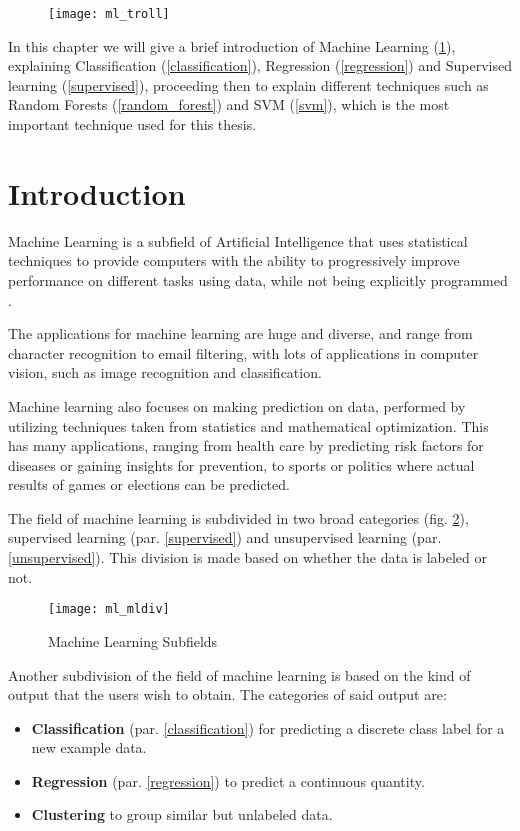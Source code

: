 
\begin{figure}[H]
	\centering
	\texttt{[image: ml\_troll]}
	\label{fig:ml_troll}
\end{figure}

In this chapter we will give a brief introduction of Machine Learning (\ref{ml}), explaining Classification (\ref{classification}), Regression (\ref{regression}) and Supervised learning (\ref{supervised}), proceeding then to explain different techniques such as Random Forests (\ref{random_forest}) and SVM (\ref{svm}), which is the most important technique used for this thesis.

\section{Introduction} \label{ml}

Machine Learning is a subfield of Artificial Intelligence that uses statistical techniques to provide computers with the ability to progressively improve performance on different tasks using data, while not being explicitly programmed \cite{wiki:ml}.

The applications for machine learning are huge and diverse, and range from character recognition to email filtering, with lots of applications in computer vision, such as image recognition and classification.

Machine learning also focuses on making prediction on data, performed by utilizing techniques taken from statistics and mathematical optimization. This has many applications, ranging from health care by predicting risk factors for diseases or gaining insights for prevention, to sports or politics where actual results of games or elections can be predicted.

The field of machine learning is subdivided in two broad categories (fig. \ref{fig:ml_mldiv}), supervised learning (par. \ref{supervised}) and unsupervised learning (par. \ref{unsupervised}). This division is made based on whether the data is labeled or not.

\begin{figure}[H]
	\centering
	\texttt{[image: ml\_mldiv]}
	\caption{Machine Learning Subfields \cite{ml_mldiv}}
	\label{fig:ml_mldiv}
\end{figure}

Another subdivision of the field of machine learning is based on the kind of output that the users wish to obtain. The categories of said output are:
\begin{itemize}[noitemsep]
	\item \textbf{Classification} (par. \ref{classification}) for predicting a discrete class label for a new example data.
	\item \textbf{Regression} (par. \ref{regression}) to predict a continuous quantity.
	\item \textbf{Clustering} to group similar but unlabeled data.
\end{itemize}


